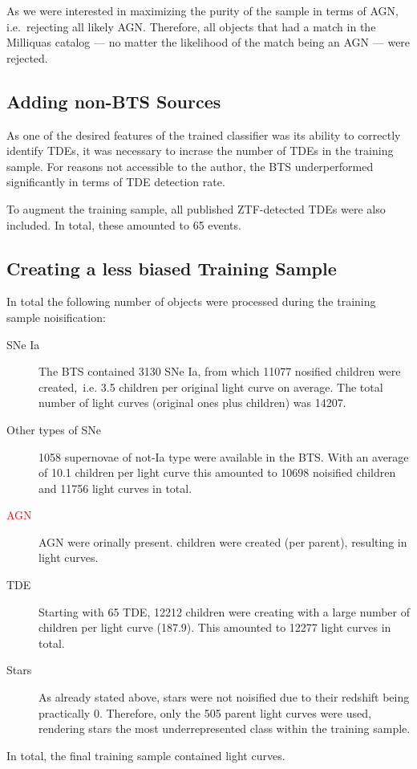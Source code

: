As we were interested in maximizing the purity of the sample in terms of AGN, i.e.~rejecting all likely AGN. Therefore, all objects that had a match in the Milliquas catalog --- no matter the likelihood of the match being an AGN --- were rejected.

\subsection{Adding non-BTS Sources}\label{addsources}
As one of the desired features of the trained classifier was its ability to correctly identify TDEs, it was necessary to incrase the number of TDEs in the training sample. For reasons not accessible to the author, the BTS underperformed significantly in terms of TDE detection rate.

To augment the training sample, all published ZTF-detected TDEs were also included. In total, these amounted to 65 events.

\subsection{Creating a less biased Training Sample}
In total the following number of objects were processed during the training sample noisification:
\begin{description}
    \item[SNe Ia] The BTS contained 3130 SNe Ia, from which 11077 nosified children were created,~i.e. 3.5 children per original light curve on average. The total number of light curves (original ones plus children) was 14207.
    \item[Other types of SNe] 1058 supernovae of not-Ia type were available in the BTS. With an average of 10.1 children per light curve this amounted to 10698 noisified children and 11756 light curves in total.
    \item[\textcolor{red}{AGN}] \xx AGN were orinally present. \xx children were created (\xx per parent), resulting in \xx light curves.
    \item[TDE] Starting with 65 TDE, 12212 children were creating with a large number of children per light curve (187.9). This amounted to 12277 light curves in total.
    \item[Stars] As already stated above, stars were not noisified due to their redshift being practically 0. Therefore, only the 505 parent light curves were used, rendering stars the most underrepresented class within the training sample.
\end{description}
In total, the final training sample contained \xx light curves.

